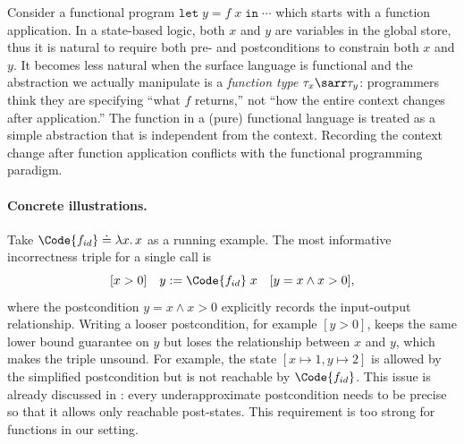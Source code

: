 Consider a functional program
$\mathtt{let}\; y = f\;x\;\mathtt{in}\; \cdots$ which starts with a function application.
In a state-based logic, both $x$ and $y$ are variables in the global store, thus it is natural to require both pre- and postconditions to constrain both $x$ and $y$.
It becomes less natural when the surface language is functional and the
abstraction we actually manipulate is a \emph{function type} $\tau_x
\sarr \tau_y$: programmers think they are specifying ``what $f$
returns,'' not ``how the entire context changes after
application.''
The function in a (pure) functional language is treated as a simple abstraction that is independent from the context. Recording the context change after function application conflicts with the functional programming paradigm.

\paragraph{Concrete illustrations.}
Take $\Code{f_{id}} \doteq \lambda x.\,x$ as a running example.
The most informative incorrectness triple for a single call is
\[
  [x > 0]\quad y \mathrel{:=} \Code{f_{id}}\;x \quad [y = x \land x > 0],
\]
where the postcondition $y = x \land x > 0$ explicitly records the input-output relationship.
Writing a looser postcondition, for example $[y > 0]$, keeps the same lower bound guarantee on $y$ but loses the relationship between $x$ and $y$, which makes the triple unsound. For example, the state $[x\mapsto 1, y\mapsto 2]$ is allowed by the simplified postcondition but is not reachable by $\Code{f_{id}}$. This issue is already discussed in \cite{OHP19}: every underapproximate postcondition needs to be precise so that it allows only reachable post-states. This requirement is too strong for functions in our setting.


